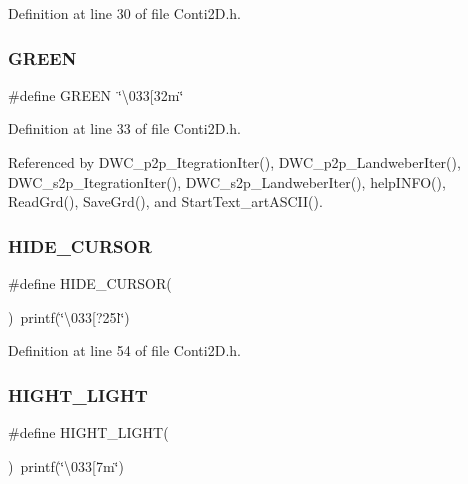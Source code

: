 Definition at line 30 of file Conti2\+D.\+h.

\mbox{\label{Conti2D_8h_acfbc006ea433ad708fdee3e82996e721_acfbc006ea433ad708fdee3e82996e721}} 
\subsubsection{G\+R\+E\+EN}
{\footnotesize\ttfamily \#define G\+R\+E\+EN~\char`\"{}\textbackslash{}033[32m\char`\"{}}



Definition at line 33 of file Conti2\+D.\+h.



Referenced by D\+W\+C\+\_\+p2p\+\_\+\+Itegration\+Iter(), D\+W\+C\+\_\+p2p\+\_\+\+Landweber\+Iter(), D\+W\+C\+\_\+s2p\+\_\+\+Itegration\+Iter(), D\+W\+C\+\_\+s2p\+\_\+\+Landweber\+Iter(), help\+I\+N\+F\+O(), Read\+Grd(), Save\+Grd(), and Start\+Text\+\_\+art\+A\+S\+C\+I\+I().

\mbox{\label{Conti2D_8h_afda389c3c8b482e025dc765d250a5a0d_afda389c3c8b482e025dc765d250a5a0d}} 
\subsubsection{H\+I\+D\+E\+\_\+\+C\+U\+R\+S\+OR}
{\footnotesize\ttfamily \#define H\+I\+D\+E\+\_\+\+C\+U\+R\+S\+OR(\begin{DoxyParamCaption}{ }\end{DoxyParamCaption})~printf(\char`\"{}\textbackslash{}033[?25l\char`\"{})}



Definition at line 54 of file Conti2\+D.\+h.

\mbox{\label{Conti2D_8h_abcf37352db560ac79462be29a1e5d2f9_abcf37352db560ac79462be29a1e5d2f9}} 
\subsubsection{H\+I\+G\+H\+T\+\_\+\+L\+I\+G\+HT}
{\footnotesize\ttfamily \#define H\+I\+G\+H\+T\+\_\+\+L\+I\+G\+HT(\begin{DoxyParamCaption}{ }\end{DoxyParamCaption})~printf(\char`\"{}\textbackslash{}033[7m\char`\"{})}



